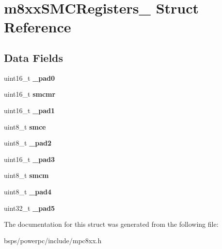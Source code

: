 \hypertarget{structm8xxSMCRegisters__}{}\section{m8xx\+S\+M\+C\+Registers\+\_\+ Struct Reference}
\label{structm8xxSMCRegisters__}
\subsection*{Data Fields}
\begin{DoxyCompactItemize}
\item 
\mbox{\label{structm8xxSMCRegisters___afcf13f6ed56b33a751b0a9b9a50000bc}} 
uint16\+\_\+t {\bfseries \+\_\+pad0}
\item 
\mbox{\label{structm8xxSMCRegisters___ac8c29c8c171a7b10e58a9dced8c87a3d}} 
uint16\+\_\+t {\bfseries smcmr}
\item 
\mbox{\label{structm8xxSMCRegisters___a000d268350dca9ad71ce555031a4aab8}} 
uint16\+\_\+t {\bfseries \+\_\+pad1}
\item 
\mbox{\label{structm8xxSMCRegisters___a0f77f95eaee129096af9f5e208cbdfd7}} 
uint8\+\_\+t {\bfseries smce}
\item 
\mbox{\label{structm8xxSMCRegisters___a9f380473a6be28fd6d39a9c7a0b40176}} 
uint8\+\_\+t {\bfseries \+\_\+pad2}
\item 
\mbox{\label{structm8xxSMCRegisters___a6953d28dccf978d82d7abac24fbc70cb}} 
uint16\+\_\+t {\bfseries \+\_\+pad3}
\item 
\mbox{\label{structm8xxSMCRegisters___a99afae1f289985747654bed8f2335ad8}} 
uint8\+\_\+t {\bfseries smcm}
\item 
\mbox{\label{structm8xxSMCRegisters___a53a7a3d2b8c131b6d842df879cecdff6}} 
uint8\+\_\+t {\bfseries \+\_\+pad4}
\item 
\mbox{\label{structm8xxSMCRegisters___a8e5056e70174e18ab50863657aa1e3d8}} 
uint32\+\_\+t {\bfseries \+\_\+pad5}
\end{DoxyCompactItemize}


The documentation for this struct was generated from the following file\+:\begin{DoxyCompactItemize}
\item 
bsps/powerpc/include/mpc8xx.\+h\end{DoxyCompactItemize}
